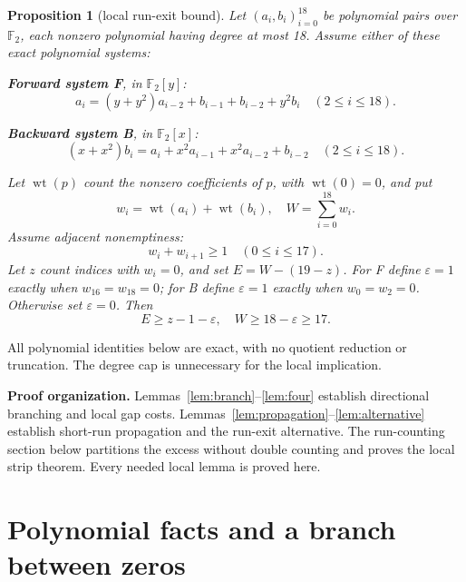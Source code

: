 \documentclass{article}
\newtheorem{proposition}{Proposition}
\DeclareMathOperator{\wt}{wt}
\newcommand{\Ftwo}{\mathbb{F}_2}
\begin{document}
\begin{proposition}[local run-exit bound]\label{prop:local}
  Let \((a_i, b_i)_{i=0}^{18}\) be polynomial pairs over \(\Ftwo\), each nonzero polynomial
  having degree at most 18. Assume either of these exact polynomial systems:

  \textbf{Forward system F}, in \(\Ftwo[y]\):
  \begin{equation}\label{eq:forward}
    a_i = (y + y^2) a_{i-2} + b_{i-1} + b_{i-2} + y^2 b_i \quad (2 \le i \le 18).
  \end{equation}

  \textbf{Backward system B}, in \(\Ftwo[x]\):
  \begin{equation}\label{eq:backward}
    (x + x^2) b_i = a_i + x^2 a_{i-1} + x^2 a_{i-2} + b_{i-2} \quad (2 \le i \le 18).
  \end{equation}

  Let \(\wt(p)\) count the nonzero coefficients of \(p\), with \(\wt(0) = 0\), and put
  \begin{equation}
    w_i = \wt(a_i) + \wt(b_i), \quad W = \sum_{i=0}^{18} w_i.
  \end{equation}
  Assume adjacent nonemptiness:
  \begin{equation}\label{eq:adjacent}
    w_i + w_{i+1} \ge 1 \quad (0 \le i \le 17).
  \end{equation}
  Let \(z\) count indices with \(w_i = 0\), and set \(E = W - (19 - z)\). For F define
  \(\varepsilon = 1\) exactly when \(w_{16} = w_{18} = 0\); for B define \(\varepsilon = 1\)
  exactly when \(w_0 = w_2 = 0\). Otherwise set \(\varepsilon = 0\). Then
  \begin{equation}\label{eq:main-bound}
    E \ge z - 1 - \varepsilon, \quad W \ge 18 - \varepsilon \ge 17.
  \end{equation}
\end{proposition}

All polynomial identities below are exact, with no quotient reduction or truncation. The degree
cap is unnecessary for the local implication.

\textbf{Proof organization.} Lemmas~\ref{lem:branch}--\ref{lem:four} establish directional
branching and local gap costs. Lemmas~\ref{lem:propagation}--\ref{lem:alternative} establish
short-run propagation and the run-exit alternative. The run-counting section below partitions
the excess without double counting and proves the local strip theorem. Every needed local lemma
is proved here.

\section{Polynomial facts and a branch between zeros}\label{sec:branch}
\end{document}
